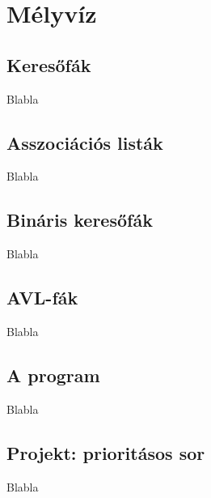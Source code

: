 \chapter{Mélyvíz}
\section{Keresőfák}
Blabla
\section{Asszociációs listák}
Blabla
\section{Bináris keresőfák}
Blabla
\section{AVL-fák}
Blabla
\section{A program}
Blabla
\section{Projekt: prioritásos sor}
Blabla
